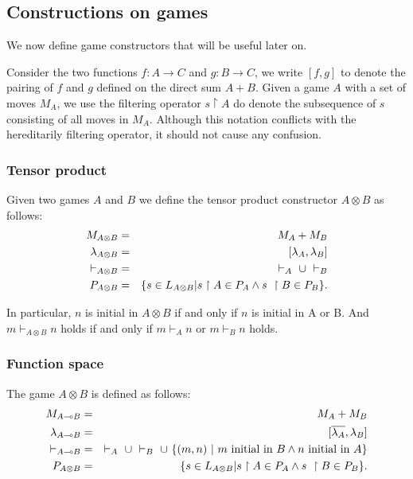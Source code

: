 \subsection{Constructions on games}
\label{sec:gameconstruction}

We now define game constructors that will be useful later on.

Consider the two functions $f : A \rightarrow C$ and $g : B
\rightarrow C$, we write $[f,g]$ to denote the pairing of $f$ and
$g$ defined on the direct sum $A + B$. Given a game $A$ with a set
of moves $M_A$, we use the filtering operator $s \upharpoonright A$
do denote the subsequence of $s$ consisting of all moves in $M_A$.
Although this notation conflicts with the hereditarily filtering
operator, it should not cause any confusion.

\subsubsection{Tensor product}
Given two games $A$ and $B$ we define the tensor product constructor
$A \otimes B$ as follows:
\begin{eqnarray*}
  M_{A \otimes B} &=& M_A + M_B \\
  \lambda_{A\otimes B} &=& [\lambda_A,\lambda_B] \\
  \vdash_{A\otimes B} & = & \vdash_{A}\ \cup\ \vdash_{B} \\
  P_{A\otimes B} & = & \{ s \in L_{A\otimes B} | s \upharpoonright A \in P_A \wedge s \ \upharpoonright B \in P_B  \}.
\end{eqnarray*}

In particular,  $n$ is initial in $A\otimes B$ if and only if $n$ is
initial in A or B. And $m \vdash_{A\otimes B} n$  holds if and only if $m
\vdash_{A} n$ or $m \vdash_{B} n$ holds.

\subsubsection{Function space}
The game $A \otimes B$ is defined as follows:
\begin{eqnarray*}
  M_{A \multimap B} &=& M_A + M_B \\
  \lambda_{A\multimap B} &=& [\overline{\lambda_A},\lambda_B] \\
  \vdash_{A\multimap B} & = & \vdash_{A}\ \union\ \vdash_{B}\ \union\  \{ (m,n) \ |\ m \mbox{ initial in } B \wedge n \mbox{ initial in } A \} \\
  P_{A\otimes B} & = & \{ s \in L_{A\otimes B} | s \upharpoonright A \in P_A \wedge s \ \upharpoonright B \in P_B  \}.
\end{eqnarray*}


